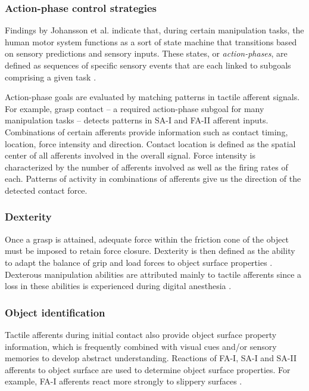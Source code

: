 \subsubsection*{Action-phase control strategies}

Findings by Johansson et al. indicate that, during certain manipulation tasks, the human motor system functions as a sort of state machine that transitions based on sensory predictions and sensory inputs.
These states, or \emph{action-phases}, are defined as sequences of specific sensory events that are each linked to subgoals comprising a given task \cite{johansson2009coding}.

Action-phase goals are evaluated by matching patterns in tactile afferent signals.
For example, grasp contact – a required action-phase subgoal for many manipulation tasks – detects patterns in SA-I and FA-II afferent inputs.
Combinations of certain afferents provide information such as contact timing, location, force intensity and direction.
Contact location is defined as the spatial center of all afferents involved in the overall signal.
Force intensity is characterized by the number of afferents involved as well as the firing rates of each.
Patterns of activity in combinations of afferents give us the direction of the detected contact force.

\subsubsection*{Dexterity}

Once a grasp is attained, adequate force within the friction cone of the object must be imposed to retain force closure.
Dexterity is then defined as the ability to adapt the balance of grip and load forces to object surface properties \cite{howe1993tactile}.
Dexterous manipulation abilities are attributed mainly to tactile afferents since a loss in these abilities is experienced during digital anesthesia \cite{Johansson1984}.

\subsubsection*{Object identification}

Tactile afferents during initial contact also provide object surface property information, which is frequently combined with visual cues and/or sensory memories to develop abstract understanding.
Reactions of FA-I, SA-I and SA-II afferents to object surface are used to determine object surface properties.
For example, FA-I afferents react more strongly to slippery surfaces \cite{burstedt1997coordination}.

